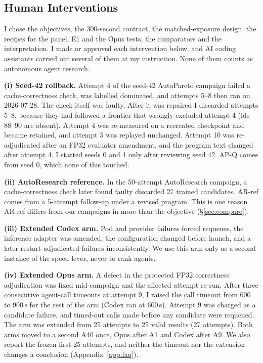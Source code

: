 \documentclass{article}
\newif\ifshowhumanmarkers \showhumanmarkersfalse
\newcommand{\humantag}[1]{{\color{humanframe}\sffamily\scriptsize\bfseries HUMAN AUTHOR MUST REWRITE/VERIFY [#1]}\ }
\newcommand{\humanauthor}[2][]{\ifshowhumanmarkers\begin{humanbox}\humantag{#1}#2\end{humanbox}\else #2\par\fi}
\begin{document}
\subsection{Human Interventions}\label{sec:interventions}
\humanauthor[P2-06 r6]{I chose the objectives, the 300-second contract, the matched-exposure design, the recipes for the panel, E1 and the Opus tests, the comparators and the interpretation. I made or approved each intervention below, and AI coding assistants carried out several of them at my instruction. None of them counts as autonomous agent research.

\textbf{(i) Seed-42 rollback.} Attempt 4 of the seed-42 AutoPareto campaign failed a cache-correctness check, was labelled dominated, and attempts 5--8 then ran on 2026-07-28. The check itself was faulty. After it was repaired I discarded attempts 5--8, because they had followed a frontier that wrongly excluded attempt 4 (ids 88--90 are absent). Attempt 4 was re-measured on a recreated checkpoint and became retained, and attempt 5 was replayed unchanged. Attempt 10 was re-adjudicated after an FP32 evaluator amendment, and the program text changed after attempt 4. I started seeds 0 and 1 only after reviewing seed 42. AP-Q comes from seed 0, which none of this touched.

\textbf{(ii) AutoResearch reference.} In the 50-attempt AutoResearch campaign, a cache-correctness check later found faulty discarded 27 trained candidates. AR-ref comes from a 5-attempt follow-up under a revised program. This is one reason AR-ref differs from our campaigns in more than the objective (\S\ref{sec:compare}).

\textbf{(iii) Extended Codex arm.} Pod and provider failures forced requeues, the inference adapter was amended, the configuration changed before launch, and a later restart adjudicated failures inconsistently. We use this arm only as a second instance of the speed lever, never to rank agents.

\textbf{(iv) Extended Opus arm.} A defect in the protected FP32 correctness adjudication was fixed mid-campaign and the affected attempt re-run. After three consecutive agent-call timeouts at attempt 9, I raised the call timeout from 600 to 900\,s for the rest of the arm (Codex ran at 600\,s). Attempt 9 was charged as a candidate failure, and timed-out calls made before any candidate were requeued. The arm was extended from 25 attempts to 25 valid results (27 attempts). Both arms moved to a second A40 once, Opus after A1 and Codex after A9. We also report the frozen first 25 attempts, and neither the timeout nor the extension changes a conclusion (Appendix~\ref{app:faq}).

}
\end{document}
